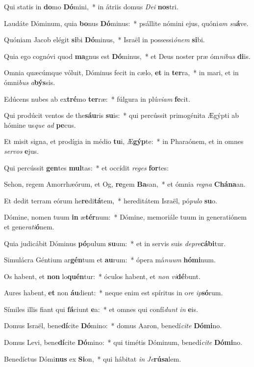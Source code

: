 \item Qui statis in \textbf{do}mo \textbf{Dó}mini,~* in átriis domus \textit{De}\textit{i} \textbf{nos}tri.
\item Laudáte Dóminum, quia \textbf{bo}nus \textbf{Dó}minus:~* psállite nómini ejus, quóni\textit{am} \textit{su}\textbf{á}ve.
\item Quóniam Jacob elégit \textbf{si}bi \textbf{Dó}minus,~* Israël in possessi\textit{ó}\textit{nem} \textbf{si}bi.
\item Quia ego cognóvi quod \textbf{ma}gnus est \textbf{Dó}minus,~* et Deus noster præ óm\textit{ni}\textit{bus} \textbf{di}is.
\item Omnia quæcúmque vóluit, Dóminus fecit in cælo, \textbf{et} in \textbf{ter}ra,~* in mari, et in ómni\textit{bus} \textit{a}\textbf{býs}sis.
\item Edúcens nubes ab ex\textbf{tré}mo \textbf{ter}ræ:~* fúlgura in plú\textit{vi}\textit{am} \textbf{fe}cit.
\item Qui prodúcit ventos de the\textbf{sáu}ris \textbf{su}is:~* qui percússit primogénita Ægýpti ab hómine us\textit{que} \textit{ad} \textbf{pe}cus.
\item Et misit signa, et prodígia in médio \textbf{tu}i, Æ\textbf{gýp}te:~* in Pharaónem, et in omnes \textit{ser}\textit{vos} \textbf{e}jus.
\item Qui percússit \textbf{gen}tes \textbf{mul}tas:~* et occídit \textit{re}\textit{ges} \textbf{for}tes:
\item Sehon, regem Amorrhæórum, et Og, \textbf{re}gem \textbf{Ba}san,~* et ómnia \textit{re}\textit{gna} \textbf{Chá}\textbf{na}an.
\item Et dedit terram eórum he\textbf{re}di\textbf{tá}tem,~* hereditátem Israël, pó\textit{pu}\textit{lo} \textbf{su}o.
\item Dómine, nomen tuum \textbf{in} æ\textbf{tér}num:~* Dómine, memoriále tuum in generatiónem et gene\textit{ra}\textit{ti}\textbf{ó}nem.
\item Quia judicábit Dóminus \textbf{pó}pulum \textbf{su}um:~* et in servis suis \textit{de}\textit{pre}\textbf{cá}\textbf{bi}tur.
\item Simulácra Géntium ar\textbf{gén}tum et \textbf{au}rum:~* ópera má\textit{nu}\textit{um} \textbf{hó}\textbf{mi}num.
\item Os habent, et \textbf{non} lo\textbf{quén}tur:~* óculos habent, et \textit{non} \textit{vi}\textbf{dé}bunt.
\item Aures habent, \textbf{et} non \textbf{áu}dient:~* neque enim est spíritus in o\textit{re} \textit{ip}\textbf{só}rum.
\item Símiles illis fiant qui \textbf{fá}ciunt \textbf{e}a:~* et omnes qui confí\textit{dunt} \textit{in} \textbf{e}is.
\item Domus Israël, bene\textbf{dí}cite \textbf{Dó}mino:~* domus Aaron, benedí\textit{ci}\textit{te} \textbf{Dó}\textbf{mi}no.
\item Domus Levi, bene\textbf{dí}cite \textbf{Dó}mino:~* qui timétis Dóminum, benedí\textit{ci}\textit{te} \textbf{Dó}\textbf{mi}no.
\item Benedíctus Dómi\textbf{nus} ex \textbf{Si}on,~* qui hábitat \textit{in} \textit{Je}\textbf{rú}\textbf{sa}lem.
